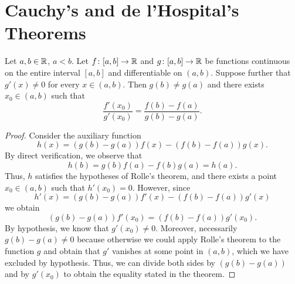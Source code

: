\section{Cauchy's and de l'Hospital's Theorems}

\begin{theorem}[Cauchy]
\label{th:cauchy}%
\mymark{**}%
%
%
%
Let $a,b\in {\mathbb R}$, $a < b$.
%
Let $f\colon[a,b]\to {\mathbb R}$ and $g\colon[a,b]\to {\mathbb R}$ be functions continuous on
the entire interval $[a,b]$ and differentiable on $(a,b)$.
Suppose further that $g'(x)\neq 0$ for every $x\in (a,b)$.
Then $g(b) \neq g(a)$ and there exists $x_0\in(a,b)$ such that
\[
  \frac{f'(x_0)}{g'(x_0)} = \frac{f(b)-f(a)}{g(b)-g(a)}.
\]
\end{theorem}
%
\begin{proof}
\mymark{**}
Consider the auxiliary function
\[
 h(x) = (g(b)-g(a))f(x) - (f(b)-f(a))g(x).
\]
By direct verification, we observe that
\[
  h(b) = g(b)f(a) - f(b)g(a) = h(a).
\]
Thus, $h$ satisfies the hypotheses of Rolle's theorem, and there exists a point
$x_0\in(a,b)$ such that $h'(x_0) = 0$.
However, since
\[
  h'(x) = (g(b) - g(a)) f'(x) - (f(b)-f(a)) g'(x)
\]
we obtain
\[
 (g(b)-g(a))f'(x_0) = (f(b) - f(a))g'(x_0).
\]
By hypothesis, we know that $g'(x_0)\neq 0$.
Moreover, necessarily $g(b) - g(a)\neq 0$ because otherwise we could apply
Rolle's theorem to the function $g$ and obtain that $g'$ vanishes at some point
in $(a,b)$, which we have excluded by hypothesis.
Thus, we can divide both sides by $(g(b)-g(a))$ and by $g'(x_0)$ to obtain the
equality stated in the theorem.
\end{proof}

